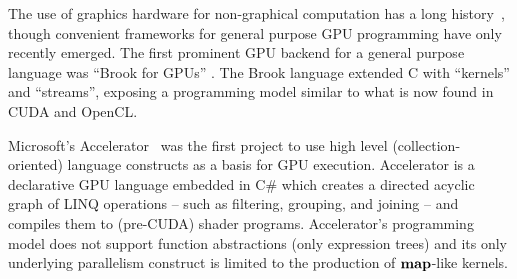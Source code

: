 \documentclass[10pt,twocolumn]{article}
\begin{document}
The use of graphics hardware for non-graphical computation has a  long history~\cite{Leng90}, though convenient frameworks for general purpose GPU programming have only recently emerged. The first prominent GPU backend for a general purpose language was ``Brook for GPUs'' \cite{Buck04}. The Brook language extended C with ``kernels'' and ``streams'', exposing a programming model similar to what is now found in CUDA and OpenCL.

Microsoft's Accelerator~\cite{Tard06} was the first project to use high level (collection-oriented) language constructs as a basis for GPU execution. Accelerator is a declarative GPU language embedded in C\# which creates a directed acyclic graph of LINQ operations -- such as filtering, grouping, and joining -- and compiles them to (pre-CUDA) shader programs. Accelerator's programming model does not support function abstractions (only expression trees) and its only underlying parallelism construct is limited to the production of $\mbox{\textbf{map}}$-like kernels.
\end{document}
